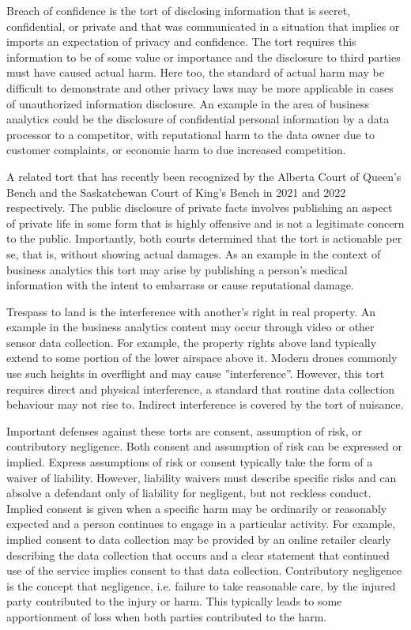 Breach of confidence is the tort of disclosing information that is secret, confidential, or private and that was communicated in a situation that implies or imports an expectation of privacy and confidence. The tort requires this information to be of some value or importance and the disclosure to third parties must have caused actual harm. Here too, the standard of actual harm may be difficult to demonstrate and other privacy laws may be more applicable in cases of unauthorized information disclosure. An example in the area of business analytics could be the disclosure of confidential personal information by a data processor to a competitor, with reputational harm to the data owner due to customer complaints, or economic harm to due increased competition.

A related tort that has recently been recognized by the Alberta Court of Queen's Bench and the Saskatchewan Court of King's Bench in 2021 and 2022 respectively. The public disclosure of private facts involves publishing an aspect of private life in some form that is highly offensive and is not a legitimate concern to the public. Importantly, both courts determined that the tort is actionable per se, that is, without showing actual damages. As an example in the context of business analytics this tort may arise by publishing a person's medical information with the intent to embarrass or cause reputational damage.

Trespass to land is the interference with another's right in real property. An example in the business analytics content may occur through video or other sensor data collection. For example, the property rights above land typically extend to some portion of the lower airspace above it. Modern drones commonly use such heights in overflight and may cause ''interference''. However, this tort requires direct and physical interference, a standard that routine data collection behaviour may not rise to. Indirect interference is covered by the tort of nuisance. 

Important defenses against these torts are consent, assumption of risk, or contributory negligence. Both consent and assumption of risk can be expressed or implied. Express assumptions of risk or consent typically take the form of a waiver of liability. However, liability waivers must describe specific risks and can absolve a defendant only of liability for negligent, but not reckless conduct. Implied consent is given when a specific harm may be ordinarily or reasonably expected and a person continues to engage in a particular activity. For example, implied consent to data collection may be provided by an online retailer clearly describing the data collection that occurs and a clear statement that continued use of the service implies consent to that data collection. Contributory negligence is the concept that negligence, i.e. failure to take reasonable care, by the injured party contributed to the injury or harm. This typically leads to some apportionment of loss when both parties contributed to the harm. 

